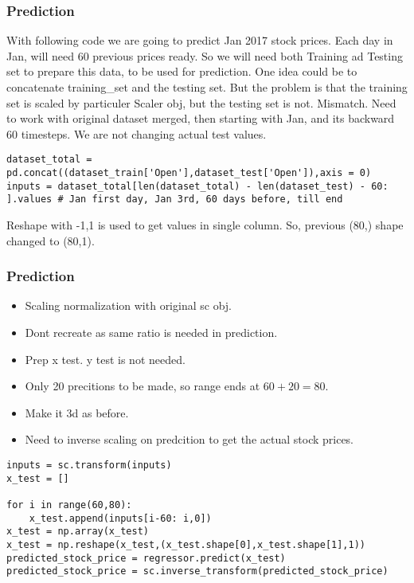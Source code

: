 \begin{frame}[fragile] \frametitle{Prediction}

With following code we are going to predict Jan 2017 stock prices. Each day in Jan, will need 60 previous prices ready. So we will need both Training ad Testing set to prepare this data, to be used for prediction. One idea could be to concatenate training\_set and the testing set. But the problem is that the training set is scaled by particuler Scaler obj, but the testing set is not. Mismatch. Need to work with original dataset merged, then starting with Jan, and its backward 60 timesteps. We are not changing actual test values.
\begin{lstlisting}
dataset_total = pd.concat((dataset_train['Open'],dataset_test['Open']),axis = 0)
inputs = dataset_total[len(dataset_total) - len(dataset_test) - 60: ].values # Jan first day, Jan 3rd, 60 days before, till end
\end{lstlisting}
Reshape with -1,1 is used to get values in single column. So, previous (80,) shape changed to (80,1).
\end{frame}



\begin{frame}[fragile] \frametitle{Prediction}
\begin{itemize}
\item Scaling normalization with original sc obj. 
\item Dont recreate as same ratio is needed in prediction.
\item Prep x test. y test is not needed.
\item Only 20 precitions to be made, so range ends at $60+20=80$. 
\item Make it 3d as before. 
\item Need to inverse scaling on predcition to get the actual stock prices.
\end{itemize}
\begin{lstlisting}
inputs = sc.transform(inputs)
x_test = []

for i in range(60,80):
    x_test.append(inputs[i-60: i,0])
x_test = np.array(x_test)
x_test = np.reshape(x_test,(x_test.shape[0],x_test.shape[1],1))
predicted_stock_price = regressor.predict(x_test)
predicted_stock_price = sc.inverse_transform(predicted_stock_price)
\end{lstlisting}

\end{frame}


